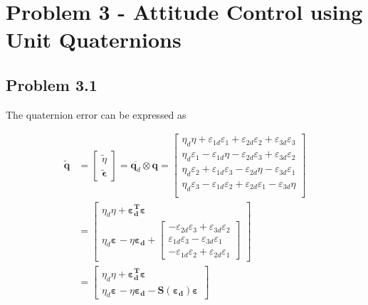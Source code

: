 \section*{Problem 3 - Attitude Control using Unit Quaternions}

\subsection*{Problem 3.1}

The quaternion error can be expressed as

\begin{equation}\label{eq:eh}
\begin{align}
\tilde{\boldsymbol{q}} &= \begin{bmatrix} \tilde{\eta} \\ \tilde{\boldsymbol{\epsilon}} \end{bmatrix} =\overline{\boldsymbol{q}_d} \otimes \boldsymbol{q} = 
\begin{bmatrix}
\eta_d\eta + \varepsilon_{1d}\varepsilon_{1}+\varepsilon_{2d}\varepsilon_{2}+\varepsilon_{3d}\varepsilon_{3}\\
\eta_d\varepsilon_{1}- \varepsilon_{1d}\eta-\varepsilon_{2d}\varepsilon_{3}+\varepsilon_{3d}\varepsilon_{2} \\
\eta_d\varepsilon_{2}+ \varepsilon_{1d}\varepsilon_{3}-\varepsilon_{2d}\eta - \varepsilon_{3d}\varepsilon_{1}\\
\eta_d\varepsilon_{3}- \varepsilon_{1d}\varepsilon_{2}+\varepsilon_{2d}\varepsilon_{1}-\varepsilon_{3d}\eta\\
\end{bmatrix}\\
&=
\begin{bmatrix}
\eta_d\eta + \boldsymbol{\varepsilon_{d}^T\varepsilon_{}}\\
\eta_d\boldsymbol{\varepsilon_{}} - \eta\boldsymbol{\varepsilon_{d}} + 
\begin{bmatrix}
-\varepsilon_{2d}\varepsilon_{3}+\varepsilon_{3d}\varepsilon_{2}\\
\varepsilon_{1d}\varepsilon_{3}-\varepsilon_{3d}\varepsilon_{1}\\
-\varepsilon_{1d}\varepsilon_{2}+\varepsilon_{2d}\varepsilon_{1}
\end{bmatrix}
\end{bmatrix}\\
&=
\begin{bmatrix}
\eta_d\eta + \boldsymbol{\varepsilon_{d}^T\varepsilon_{}}\\
\eta_d\boldsymbol{\varepsilon_{}} - \eta\boldsymbol{\varepsilon_{d}} - \boldsymbol{S}(\boldsymbol{\varepsilon_{d}})\boldsymbol{\varepsilon_{}}
\end{bmatrix}
\end{align}
\end{equation}


